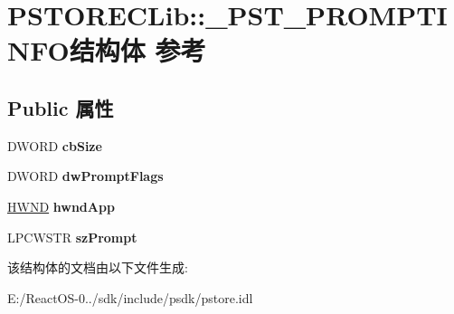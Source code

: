 \hypertarget{struct_p_s_t_o_r_e_c_lib_1_1___p_s_t___p_r_o_m_p_t_i_n_f_o}{}\section{P\+S\+T\+O\+R\+E\+C\+Lib\+:\+:\+\_\+\+P\+S\+T\+\_\+\+P\+R\+O\+M\+P\+T\+I\+N\+F\+O结构体 参考}
\label{struct_p_s_t_o_r_e_c_lib_1_1___p_s_t___p_r_o_m_p_t_i_n_f_o}
\subsection*{Public 属性}
\begin{DoxyCompactItemize}
\item 
\mbox{\label{struct_p_s_t_o_r_e_c_lib_1_1___p_s_t___p_r_o_m_p_t_i_n_f_o_ab1c2b2fafcdd8c7dadcb74ce1cf82cbb}} 
D\+W\+O\+RD {\bfseries cb\+Size}
\item 
\mbox{\label{struct_p_s_t_o_r_e_c_lib_1_1___p_s_t___p_r_o_m_p_t_i_n_f_o_aee30d1a26ea3e383933ed5705e190ec2}} 
D\+W\+O\+RD {\bfseries dw\+Prompt\+Flags}
\item 
\mbox{\label{struct_p_s_t_o_r_e_c_lib_1_1___p_s_t___p_r_o_m_p_t_i_n_f_o_a88a85000d137163f3f04f59ebb9821c3}} 
\hyperlink{interfacevoid}{H\+W\+ND} {\bfseries hwnd\+App}
\item 
\mbox{\label{struct_p_s_t_o_r_e_c_lib_1_1___p_s_t___p_r_o_m_p_t_i_n_f_o_a8c2a87459949a11e055750e64bc0dbc5}} 
L\+P\+C\+W\+S\+TR {\bfseries sz\+Prompt}
\end{DoxyCompactItemize}


该结构体的文档由以下文件生成\+:\begin{DoxyCompactItemize}
\item 
E\+:/\+React\+O\+S-\/0../sdk/include/psdk/pstore.\+idl\end{DoxyCompactItemize}
